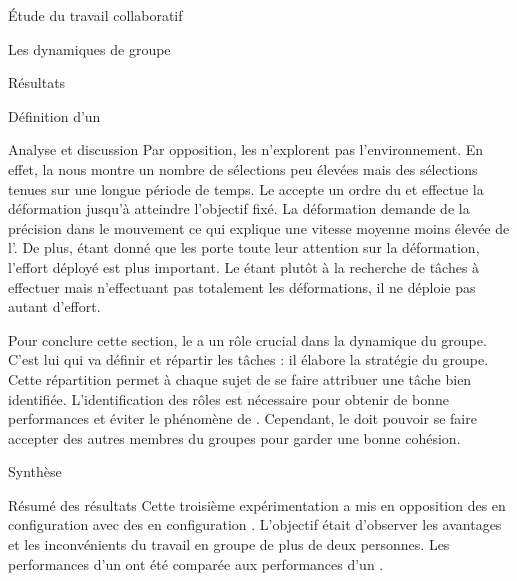 \documentclass[myfrancais]{mythesis}
\begin{document}
\begin{mypart}{Étude du travail collaboratif}
\begin{mychapter}{Les dynamiques de groupe}
\begin{mysection}{Résultats}
\begin{mysubsection}{Définition d'un }
\begin{mysubsubsection}{Analyse et discussion}
						Par opposition, les  n'explorent pas l'environnement.
						En effet, la  nous montre un nombre de sélections peu élevées mais des sélections tenues sur une longue période de temps.
						Le  accepte un ordre du  et effectue la déformation jusqu'à atteindre l'objectif fixé.
						La déformation demande de la précision dans le mouvement ce qui explique une vitesse moyenne moins élevée de l'.
						De plus, étant donné que les  porte toute leur attention sur la déformation, l'effort déployé est plus important.
						Le  étant plutôt à la recherche de tâches à effectuer mais n'effectuant pas totalement les déformations, il ne déploie pas autant d'effort.

						Pour conclure cette section, le  a un rôle crucial dans la dynamique du groupe.
						C'est lui qui va définir et répartir les tâches : il élabore la stratégie du groupe.
						Cette répartition permet à chaque sujet de se faire attribuer une tâche bien identifiée.
						L'identification des rôles est nécessaire pour obtenir de bonne performances et éviter le phénomène de  .
						Cependant, le  doit pouvoir se faire accepter des autres membres du groupes pour garder une bonne cohésion.
					\end{mysubsubsection}
				\end{mysubsection}
			\end{mysection}
			\begin{mysection}{Synthèse}
				\begin{mysubsection}{Résumé des résultats}
					Cette troisième expérimentation a mis en opposition des  en configuration  avec des  en configuration .
					L'objectif était d'observer les avantages et les inconvénients du travail en groupe de plus de deux personnes.
					Les performances d'un  ont été comparée aux performances d'un .


\end{mysubsection}
\end{mysection}
\end{mychapter}
\end{mypart}
\end{document}
